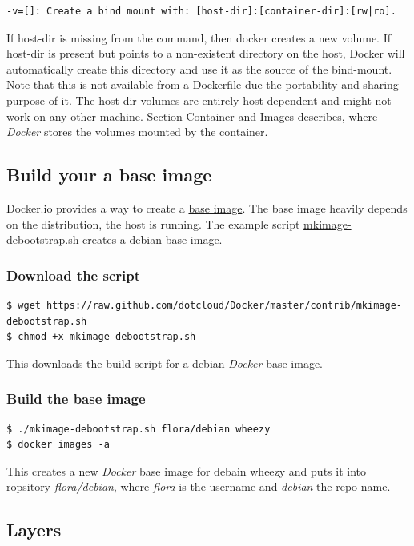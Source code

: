 \documentclass[captions=tableheading]{article}
\begin{document}
\begin{verbatim}
-v=[]: Create a bind mount with: [host-dir]:[container-dir]:[rw|ro].
\end{verbatim}
If host-dir is missing from the command, then docker creates a new volume. If host-dir is present but points to a non-existent directory on the host, Docker will automatically create this directory and use it as the source of the bind-mount.
Note that this is not available from a Dockerfile due the portability and sharing purpose of it. The host-dir volumes are entirely host-dependent and might not work on any other machine. \hyperref[sec-2-5]{Section Container and Images} describes, where \emph{Docker} stores the volumes mounted by the container.
\subsection{Build your a base image}
\label{sec-2-3}

Docker.io provides a way to create a \href{http://docs.docker.io/en/latest/articles/baseimages/}{base image}. The base image heavily depends on the distribution, the host is running. The example script \href{https://github.com/dotcloud/Docker/blob/master/contrib/mkimage-debootstrap.sh}{mkimage-debootstrap.sh} creates a debian base image.
\subsubsection{Download the script}
\label{sec-2-3-1}


\begin{verbatim}
$ wget https://raw.github.com/dotcloud/Docker/master/contrib/mkimage-debootstrap.sh
$ chmod +x mkimage-debootstrap.sh
\end{verbatim}
This downloads the build-script for a debian \emph{Docker} base image.
\subsubsection{Build the base image}
\label{sec-2-3-2}


\begin{verbatim}
$ ./mkimage-debootstrap.sh flora/debian wheezy 
$ docker images -a
\end{verbatim}
This creates a new \emph{Docker} base image for debain wheezy and puts it into ropsitory \emph{flora/debian}, where \emph{flora} is the username and \emph{debian} the repo name.
\subsection{Layers}
\label{sec-2-4}
\end{document}
